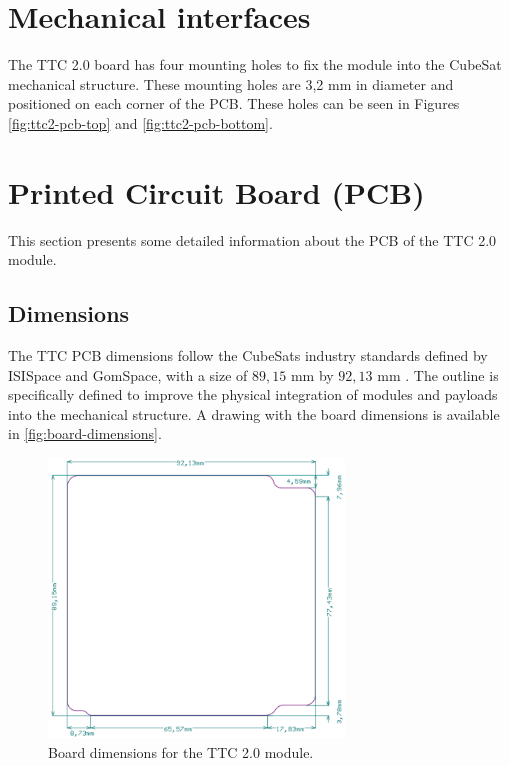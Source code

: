 \section{Mechanical interfaces}

The TTC 2.0 board has four mounting holes to fix the module into the CubeSat mechanical structure. These mounting holes are 3,2 mm in diameter and positioned on each corner of the PCB. These holes can be seen in Figures \ref{fig:ttc2-pcb-top} and \ref{fig:ttc2-pcb-bottom}.

\section{Printed Circuit Board (PCB)}

This section presents some detailed information about the PCB of the TTC 2.0 module.

\subsection{Dimensions}

The TTC PCB dimensions follow the CubeSats industry standards defined by ISISpace and GomSpace, with a size of $89,15$ mm by $92,13$ mm \cite{nasa-handout}. The outline is specifically defined to improve the physical integration of modules and payloads into the mechanical structure. A drawing with the board dimensions is available in \autoref{fig:board-dimensions}.

\begin{figure}[!ht]
    \begin{center}
        \includegraphics[width=0.7\textwidth]{figures/board-dimensions.png}
        \caption{Board dimensions for the TTC 2.0 module.}
        \label{fig:board-dimensions}
    \end{center}
\end{figure}

